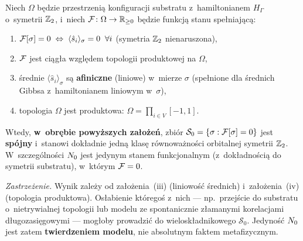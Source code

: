 \begin{theorem}\label{thm:N0-unique}
Niech $\Omega$ b\k{e}dzie przestrzeni\k{a} konfiguracji substratu
z~hamiltonianem $H_\Gamma$ o~symetrii $\mathbb{Z}_2$, i~niech
$\mathcal{F}\colon\Omega\to\mathbb{R}_{\ge 0}$ b\k{e}dzie funkcj\k{a}
stanu spe\l{}niaj\k{a}c\k{a}:
\begin{enumerate}[nosep]
  \item $\mathcal{F}[\sigma] = 0 \;\Leftrightarrow\;
    \langle\hat{s}_i\rangle_\sigma = 0\;\;\forall i$
    (symetria $\mathbb{Z}_2$ nienaruszona),
  \item $\mathcal{F}$ jest ci\k{a}g\l{}a wzgl\k{e}dem topologii
    produktowej na $\Omega$,
  \item \'srednie $\langle\hat{s}_i\rangle_\sigma$ s\k{a}
    \textbf{afiniczne} (liniowe) w~mierze $\sigma$
    (spe\l{}nione dla \'srednich Gibbsa z~hamiltonianem
    liniowym w~$\sigma$),
  \item topologia $\Omega$ jest produktowa: $\Omega = \prod_{i\in V}[-1,1]$.
\end{enumerate}
Wtedy, \textbf{w~obr\k{e}bie powy\.zszych za\l{}o\.ze\'n},
zbi\'or $\mathcal{S}_0 = \{\sigma:\mathcal{F}[\sigma]=0\}$
jest \textbf{sp\'ojny} i~stanowi dok\l{}adnie jedn\k{a}
klas\k{e} r\'ownowa\.zno\'sci orbitalnej symetrii $\mathbb{Z}_2$.
W~szczeg\'olno\'sci $N_0$ jest jedynym stanem
funkcjonalnym (z~dok\l{}adno\'sci\k{a} do symetrii substratu),
w~kt\'orym $\mathcal{F} = 0$.

\medskip\noindent\emph{Zastrze\.zenie.} Wynik zale\.zy
od za\l{}o\.zenia~(iii) (liniowo\'s\'c \'srednich)
i~za\l{}o\.zenia~(iv) (topologia produktowa). Os\l{}abienie
kt\'orego\'s z~nich --- np.\ przej\'scie do substratu
o~nietrywialnej topologii lub modelu ze spontanicznie
z\l{}amanymi korelacjami d\l{}ugozasi\k{e}gowymi --- mog\l{}oby
prowadzi\'c do wielosk\l{}adnikowego $\mathcal{S}_0$.
Jedyno\'s\'c $N_0$ jest zatem \textbf{twierdzeniem modelu},
nie absolutnym faktem metafizycznym.
\end{theorem}

